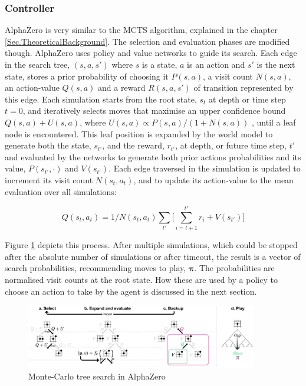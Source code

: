 \subsubsection{Controller}

AlphaZero \cite{Algo.AlphaZero} is very similar to the MCTS algorithm, explained in the chapter \ref{Sec.TheoreticalBackground}. The selection and evaluation phases are modified though. AlphaZero uses policy and value networks to guide its search. Each edge in the search tree, $(s, a, s')$ where $s$ is a state, $a$ is an action and $s'$ is the next state, stores a prior probability of choosing it $P(s, a)$, a visit count $N(s, a)$, an action-value $Q(s, a)$ and a reward $R(s, a, s')$ of transition represented by this edge. Each simulation starts from the root state, $s_t$ at depth or time step $t=0$, and iteratively selects moves that maximise an upper confidence bound $Q(s, a) + U(s, a)$, where $U(s, a) \propto P(s, a)/(1+ N(s, a))$ \cite{Algo.AlphaGoZero}, until a leaf node is encountered. This leaf position is expanded by the world model to generate both the state, $s_{t'}$, and the reward, $r_{t'}$, at depth, or future time step, $t'$ and evaluated by the networks to generate both prior actions probabilities and its value, $P(s_{t'}, \cdot)$ and $V(s_{t'})$. Each edge traversed in the simulation is updated to increment its visit count $N(s_t, a_t)$, and to update its action-value to the mean evaluation over all simulations:

$$Q(s_t, a_t) = 1/N(s_t, a_t) \sum_{t'}\Big[ \sum^{t'}_{i = t + 1}r_i + V(s_{t'}) \Big]$$

Figure \ref{Fig.MCTSinAlphaZero} depicts this process. After multiple simulations, which could be stopped after the absolute number of simulations or after timeout, the result is a vector of search probabilities, recommending moves to play, $\boldsymbol\pi$. The probabilities are normalised visit counts at the root state. How these are used by a policy to choose an action to take by the agent is discussed in the next section.

\begin{figure}[H]
\includegraphics[width=0.9\textwidth,keepaspectratio]{figures/AlphaZero/MCTS.png}
\caption{Monte-Carlo tree search in AlphaZero \cite{Algo.AlphaGoZero}}
\label{Fig.MCTSinAlphaZero}
\end{figure}

